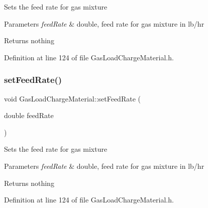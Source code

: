 Sets the feed rate for gas mixture


\begin{DoxyParams}{Parameters}
{\em feed\+Rate} & double, feed rate for gas mixture in lb/hr\\
\hline
\end{DoxyParams}
\begin{DoxyReturn}{Returns}
nothing 
\end{DoxyReturn}


Definition at line 124 of file Gas\+Load\+Charge\+Material.\+h.

\mbox{\label{class_gas_load_charge_material_a922b728dfd109d1c1684d7dfad82ec8e}} 
\subsubsection{\texorpdfstring{set\+Feed\+Rate()}{setFeedRate()}\hspace{0.1cm}{\footnotesize\ttfamily [2/3]}}
{\footnotesize\ttfamily void Gas\+Load\+Charge\+Material\+::set\+Feed\+Rate (\begin{DoxyParamCaption}\item[{double}]{feed\+Rate }\end{DoxyParamCaption})\hspace{0.3cm}{\ttfamily [inline]}}

Sets the feed rate for gas mixture


\begin{DoxyParams}{Parameters}
{\em feed\+Rate} & double, feed rate for gas mixture in lb/hr\\
\hline
\end{DoxyParams}
\begin{DoxyReturn}{Returns}
nothing 
\end{DoxyReturn}


Definition at line 124 of file Gas\+Load\+Charge\+Material.\+h.

\mbox{\label{class_gas_load_charge_material_a922b728dfd109d1c1684d7dfad82ec8e}} 
